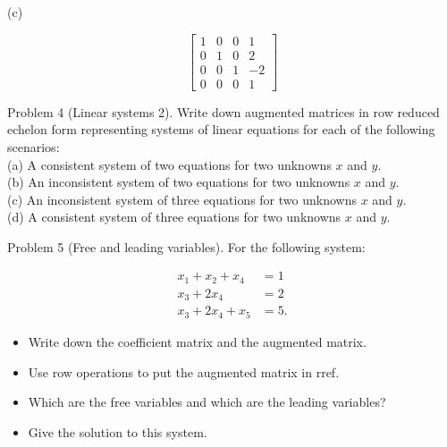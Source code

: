 \documentclass[10pt]{article}
\begin{document}
(c)

$$
\left[\begin{array}{ccc|c}
1 & 0 & 0 & 1 \\
0 & 1 & 0 & 2 \\
0 & 0 & 1 & -2 \\
0 & 0 & 0 & 1
\end{array}\right]
$$

Problem 4 (Linear systems 2). Write down augmented matrices in row reduced echelon form representing systems of linear equations for each of the following scenarios:\\
(a) A consistent system of two equations for two unknowns $x$ and $y$.\\
(b) An inconsistent system of two equations for two unknowns $x$ and $y$.\\
(c) An inconsistent system of three equations for two unknowns $x$ and $y$.\\
(d) A consistent system of three equations for two unknowns $x$ and $y$.

Problem 5 (Free and leading variables). For the following system:

$$
\begin{aligned}
x_{1}+x_{2}+x_{4} & =1 \\
x_{3}+2 x_{4} & =2 \\
x_{3}+2 x_{4}+x_{5} & =5 .
\end{aligned}
$$

\begin{itemize}
  \item Write down the coefficient matrix and the augmented matrix.
  \item Use row operations to put the augmented matrix in rref.
  \item Which are the free variables and which are the leading variables?
  \item Give the solution to this system.
\end{itemize}
\end{document}
